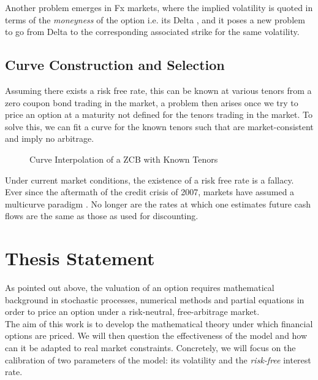 \documentclass{article}
\begin{document}
Another problem emerges in Fx markets, where the implied volatility is quoted in terms of the \textit{moneyness} of the option i.e. its Delta \citep{wys}, and it poses a new problem to go from Delta to the corresponding associated strike for the same volatility.

\subsection{Curve Construction and Selection}
Assuming there exists a risk free rate, this can be known at various tenors from a zero coupon bond trading in the market, a problem then arises once we try to price an option at a maturity not defined for the tenors trading in the market. To solve this, we can fit a curve for the known tenors such that are market-consistent and imply no arbitrage. \\

\begin{figure}[h]
    \centering
    \caption{Curve Interpolation of a ZCB with Known Tenors}
\end{figure}

Under current market conditions, the existence of a risk free rate is a fallacy. Ever since the aftermath of the credit crisis of 2007, markets have assumed a multicurve paradigm \citep{len}. No longer are the rates at which one estimates future cash flows are the same as those as used for discounting.

\section{Thesis Statement}
As pointed out above, the valuation of an option requires mathematical background in stochastic processes, numerical methods and partial equations in order to price an option under a risk-neutral, free-arbitrage market.\\

The aim of this work is to develop the mathematical theory under which financial options are priced. We will then question the effectiveness of the model and how can it be adapted to real market constraints. Concretely, we will focus on the calibration of two parameters of the model: its volatility and the \textit{risk-free} interest rate.

\newpage
\nocite{*}

\end{document}
